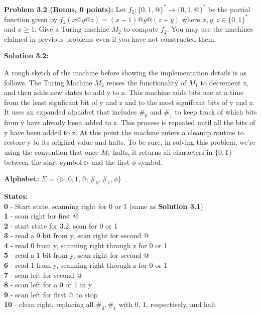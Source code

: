 \documentclass[11pt]{article}
\begin{document}
\newpage


\textbf{Problem 3.2 (Bonus, 0 points):} Let $f_2:\{0,1,@\}^* \to  \{0,1,@\}^*$ be the partial function given by $f_2(x@y@z) = (x-1) @ y @ (z + y)$ where $x,y,z\in \{0,1\}^*$ and $x \ge 1$. Give a Turing machine $M_2$ to compute $f_2$. You may use the machines claimed in previous problems even if you have not constructed them. 

\textbf{Solution 3.2:}

A rough sketch of the machine before showing the implementation details is as follows. The Turing Machine $M_2$ reuses the functionality of $M_1$ to decrement x, and then adds new states to add y to z. This machine adds bits one at a time from the least signficant bit of y and z and to the most signifcant bits of y and z. It uses an expanded alphabet that includes $\#_0$ and $\#_1$ to keep track of which bits from y have already been added to z. This process is repeated until all the bits of y have been added to z. At this point the machine enters a cleanup routine to restore y to its original value and halts. To be sure, in solving this problem, we're using the convention that once $M_1$ halts, it returns all characters in $\{0, 1\}$ between the start symbol $\triangleright$ and the first $\phi$ symbol.

\textbf{Alphabet:} $\Sigma = \{\triangleright, 0, 1, @, \#_0, \#_1, \phi\}$

\textbf{States:}\\
\textbf{0} - Start state, scanning right for 0 or 1 (same as \textbf{Solution 3.1}) \\
\textbf{1} - scan right for first @ \\
\textbf{2} - start state for 3.2, scan for 0 or 1 \\
\textbf{3} - read a 0 bit from y, scan right for second @ \\
\textbf{4} - read 0 from y, scanning right through z for 0 or 1 \\
\textbf{5} - read a 1 bit from y, scan right for second @ \\
\textbf{6} - read 1 from y, scanning right through z for 0 or 1 \\
\textbf{7} - scan left for second @ \\
\textbf{8} - scan left for a 0 or 1 in y \\
\textbf{9} - scan left for first @ to stop \\
\textbf{10} - clean right, replacing all $\#_0, \#_1$ with 0, 1, respectively, and halt  \\
\end{document}

